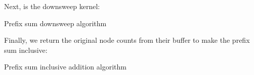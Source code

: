 \documentclass{thesis}
\begin{document}
Next, is the downsweep kernel:
\begin{algorithm}
    \label{alg:PrefixDownsweep}
    \caption{Prefix sum downsweep algorithm}
    \begin{algorithmic}
        \For{}
        \EndFor
    \end{algorithmic}
\end{algorithm}

Finally, we return the original node counts from their buffer to make the prefix sum inclusive:
\begin{algorithm}
    \label{alg:PrefixInclusive}
    \caption{Prefix sum inclusive addition algorithm}
    \begin{algorithmic}
        \For{}
        \EndFor
    \end{algorithmic}
\end{algorithm}
\end{document}
